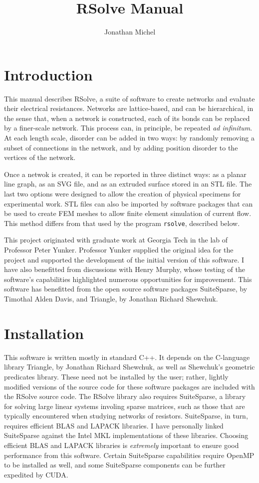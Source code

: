 \documentclass{article}
\author{Jonathan Michel}
\title{RSolve Manual}
\begin{document}
\maketitle

\tableofcontents

\section{Introduction}

This manual describes RSolve, a suite of software to create networks and
evaluate their electrical resistances. Networks are lattice-based, and can
be hierarchical, in the sense that, when a network is constructed, each of
its bonds can be replaced by a finer-scale network. This process can, in
principle, be repeated \emph{ad infinitum}. At each length scale, disorder
can be added in two ways: by randomly removing a subset of connections in
the network, and by adding position disorder to the vertices of the network.

Once a netwok is created, it can be reported in three distinct ways: as a
planar line graph, as an SVG file, and as an extruded surface stored in an STL
file. The last two options were designed to allow
the creation of physical specimens for experimental work. STL files can also
be imported by software packages that can be used to create FEM meshes to
allow finite element simulation of current flow. This method differs from
that used by the program \texttt{rsolve}, described below.

This project originated with graduate work at Georgia Tech in the lab of
Professor Peter Yunker. Professor Yunker supplied the original idea for the
project and supported the development of the initial version of this software.
I have also benefitted from discussions with Henry Murphy, whose testing of
the software's capabilities highlighted numerous opportunities for improvement.
This software has benefitted from the open source software packages SuiteSparse,
by Timothal Alden Davis, and Triangle, by Jonathan Richard Shewchuk.

\section{Installation}

This software is written mostly in standard C++. It depends on the C-language
library Triangle, by Jonathan Richard Shewchuk, as well as Shewchuk's
geometric predicates library. These need not be installed by the user; rather,
lightly modified versions of the source code for these software packages are
included with the RSolve source code. The RSolve library also requires
SuiteSparse, a library for solving large linear systems involing sparse
matrices, such as those that are typically encountered when studying networks of
resistors. SuiteSparse, in turn, requires efficient BLAS and LAPACK libraries. I
have personally linked SuiteSparse against the Intel MKL implementations of
these libraries. Choosing efficient BLAS and LAPACK libraries is 
\emph{extremely} important to ensure good performance from this software.
Certain SuiteSparse capabilities require OpenMP to be installed as well, and
some SuiteSparse components can be further expedited by CUDA.
\end{document}
